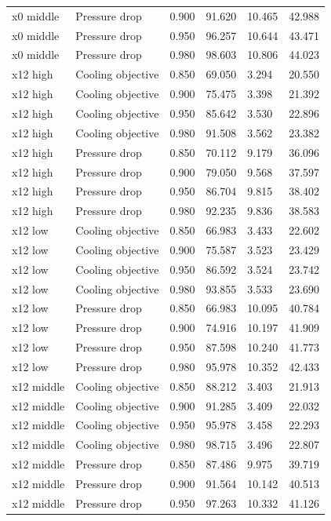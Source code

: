 \begin{longtable}{llllll}
x0 middle & Pressure drop & 0.900 & 91.620 & 10.465 & 42.988\\
x0 middle & Pressure drop & 0.950 & 96.257 & 10.644 & 43.471\\
x0 middle & Pressure drop & 0.980 & 98.603 & 10.806 & 44.023\\
x12 high & Cooling objective & 0.850 & 69.050 & 3.294 & 20.550\\
x12 high & Cooling objective & 0.900 & 75.475 & 3.398 & 21.392\\
x12 high & Cooling objective & 0.950 & 85.642 & 3.530 & 22.896\\
x12 high & Cooling objective & 0.980 & 91.508 & 3.562 & 23.382\\
x12 high & Pressure drop & 0.850 & 70.112 & 9.179 & 36.096\\
x12 high & Pressure drop & 0.900 & 79.050 & 9.568 & 37.597\\
x12 high & Pressure drop & 0.950 & 86.704 & 9.815 & 38.402\\
x12 high & Pressure drop & 0.980 & 92.235 & 9.836 & 38.583\\
x12 low & Cooling objective & 0.850 & 66.983 & 3.433 & 22.602\\
x12 low & Cooling objective & 0.900 & 75.587 & 3.523 & 23.429\\
x12 low & Cooling objective & 0.950 & 86.592 & 3.524 & 23.742\\
x12 low & Cooling objective & 0.980 & 93.855 & 3.533 & 23.690\\
x12 low & Pressure drop & 0.850 & 66.983 & 10.095 & 40.784\\
x12 low & Pressure drop & 0.900 & 74.916 & 10.197 & 41.909\\
x12 low & Pressure drop & 0.950 & 87.598 & 10.240 & 41.773\\
x12 low & Pressure drop & 0.980 & 95.978 & 10.352 & 42.433\\
x12 middle & Cooling objective & 0.850 & 88.212 & 3.403 & 21.913\\
x12 middle & Cooling objective & 0.900 & 91.285 & 3.409 & 22.032\\
x12 middle & Cooling objective & 0.950 & 95.978 & 3.458 & 22.293\\
x12 middle & Cooling objective & 0.980 & 98.715 & 3.496 & 22.807\\
x12 middle & Pressure drop & 0.850 & 87.486 & 9.975 & 39.719\\
x12 middle & Pressure drop & 0.900 & 91.564 & 10.142 & 40.513\\
x12 middle & Pressure drop & 0.950 & 97.263 & 10.332 & 41.126\\

\end{longtable}
